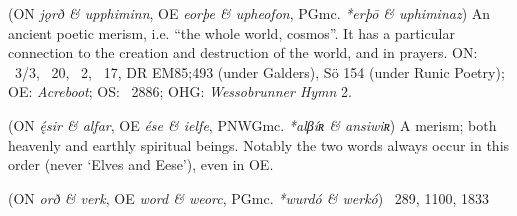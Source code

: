 \begin{itemize}
 (ON \emph{jǫrð \& upphiminn}, OE \emph{eorþe \& upheofon}, PGmc. \emph{*erþō \& uphiminaz})
  An ancient poetic merism, i.e. “the whole world, cosmos”. It has a particular connection to the creation and destruction of the world, and in prayers.
  ON: \Voluspa\ 3/3, \Vafthrudnismal\ 20, \Thrymskvida\ 2, \Oddrunargratr\ 17, DR EM85;493 (under Galders), Sö 154 (under Runic Poetry);
  OE: \emph{Acreboot};
  OS: \Heliand\ 2886;
  OHG: \emph{Wessobrunner Hymn} 2.

 (ON \emph{ę́sir \& alfar}, OE \emph{ése \& ielfe}, PNWGmc. \emph{*alβíʀ \& ansiwiʀ})
  A merism; both heavenly and earthly spiritual beings.  Notably the two words always occur in this order (never ‘Elves and Eese’), even in OE.

 (ON \emph{orð \& verk}, OE \emph{word \& weorc}, PGmc. \emph{*wurdó \& werkó})
  \Beowulf\ 289, 1100, 1833

\end{itemize}
